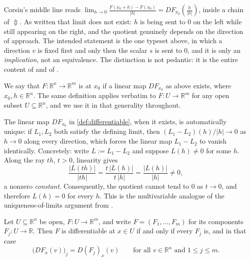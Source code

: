 \begin{ainote}
Corsin's middle line reads
$\lim_{h\to0}\frac{F(x_0+h)-F(x_0)}{|h|} = DF_{x_0}\!\left(\frac{h}{|h|}\right)$, inside a chain
of $\Updownarrow$. As written that limit does not exist: $h$ is being sent to $0$ on the left
while still appearing on the right, and the quotient genuinely depends on the direction of
approach. The intended statement is the one typeset above, in which a direction $v$ is fixed first
and only then the scalar $s$ is sent to $0$, and it is only an \emph{implication}, not an
equivalence. The distinction is not pedantic: it is the entire content of
 and of
.
\end{ainote}

\begin{definition}[Differentiability]
\label{def:differentiable}
We say that $F : \mathbb{R}^n \to \mathbb{R}^m$ is 
 at $x_0$ if a linear map $DF_{x_0}$ as above exists, where
$x_0, h \in \mathbb{R}^n$. The same definition applies verbatim to $F : U \to \mathbb{R}^m$
for any open subset $U \subseteq \mathbb{R}^n$, and we use it in that generality throughout.
\end{definition}

\begin{remark}
The linear map $DF_{x_0}$ in \cref{def:differentiable}, when it exists, is automatically unique:
if $L_1, L_2$ both satisfy the defining limit, then
$(L_1-L_2)(h)/|h| \to 0$ as $h \to 0$ along every direction, which forces the linear map
$L_1 - L_2$ to vanish identically. Concretely: write $L := L_1-L_2$ and suppose $L(h) \neq 0$
for some $h$. Along the ray $th$, $t > 0$, linearity gives
\[\frac{|L(th)|}{|th|} = \frac{t\,|L(h)|}{t\,|h|} = \frac{|L(h)|}{|h|} \neq 0,\]
a nonzero \emph{constant}. Consequently, the quotient cannot tend to $0$ as $t \to 0$, and
therefore $L(h)=0$ for every $h$. This
is the multivariable analogue of the uniqueness-of-limits argument from
.
\end{remark}

\begin{lemma}
\label{lem:differentiability_componentwise}
Let $U \subseteq \mathbb{R}^n$ be open, $F : U \to \mathbb{R}^m$, and write
$F = (F_1,\dots,F_m)$ for its components $F_j : U \to \mathbb{R}$. Then $F$ is differentiable at
$x \in U$ if and only if every $F_j$ is, and in that case
\[\big(DF_x(v)\big)_j = D(F_j)_x(v) \qquad \text{for all } v \in \mathbb{R}^n \text{ and } 1 \leq j \leq m.\]
\end{lemma}


